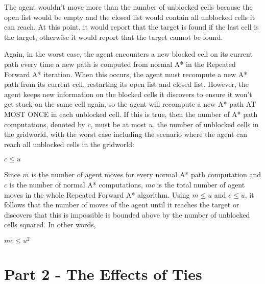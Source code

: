 \documentclass[10pt,a4paper]{article}
\begin{document}
The agent wouldn't move more than the number of unblocked cells because the open list would be empty and the closed list would contain all unblocked cells it can reach. At this point, it would report that the target is found if the last cell is the target, otherwise it would report that the target cannot be found.

Again, in the worst case, the agent encounters a new blocked cell on its current path every time a new path is computed from normal A* in the Repeated Forward A* iteration. When this occurs, the agent must recompute a new A* path from its current cell, restarting its open list and closed list. However, the agent keeps new information on the blocked cells it discovers to ensure it won't get stuck on the same cell again, so the agent will recompute a new A* path AT MOST ONCE in each unblocked cell. If this is true, then the number of A* path computations, denoted by $c$, must be at most $u$, the number of unblocked cells in the gridworld, with the worst case including the scenario where the agent can reach all unblocked cells in the gridworld:
\begin{center} $c \leq u$\end{center}

Since $m$ is the number of agent moves for every normal A* path computation and $c$ is the number of normal A* computations, $mc$ is the total number of agent moves in the whole Repeated Forward A* algorithm. Using $m \leq u$ and $c \leq u$, it follows that the number of moves of the agent until it reaches the target or discovers that this is impossible is bounded above by the number of unblocked cells squared. In other words,
\begin{center} $mc \leq u^2$\end{center}

\section*{Part 2 - The Effects of Ties}
\end{document}
